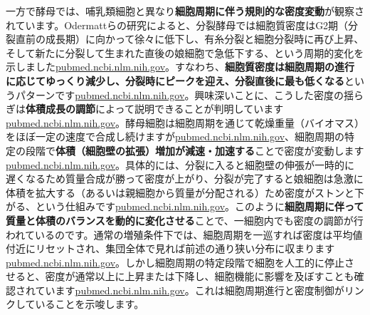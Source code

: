 一方で酵母では、哺乳類細胞と異なり\textbf{細胞周期に伴う規則的な密度変動}が観察されています。Odermattらの研究によると、分裂酵母では細胞質密度はG2期（分裂直前の成長期）に向かって徐々に低下し、有糸分裂と細胞分裂時に再び上昇、そして新たに分裂して生まれた直後の娘細胞で急低下する、という周期的変化を示しました\href{https://pubmed.ncbi.nlm.nih.gov/34100714/\#:~:text=Intracellular\%20density\%20impacts\%20the\%20physical,Spatially\%20heterogeneous\%20patterns\%20of\%20density}{pubmed.ncbi.nlm.nih.gov}。すなわち、\textbf{細胞質密度は細胞周期の進行に応じてゆっくり減少し、分裂時にピークを迎え、分裂直後に最も低くなる}というパターンです\href{https://pubmed.ncbi.nlm.nih.gov/34100714/\#:~:text=Intracellular\%20density\%20impacts\%20the\%20physical,cycle}{pubmed.ncbi.nlm.nih.gov}。興味深いことに、こうした密度の揺らぎは\textbf{体積成長の調節}によって説明できることが判明しています\href{https://pubmed.ncbi.nlm.nih.gov/34100714/\#:~:text=rapidly\%20at\%20cell\%20birth,cycle\%20arrests}{pubmed.ncbi.nlm.nih.gov}。酵母細胞は細胞周期を通じて乾燥重量（バイオマス）をほぼ一定の速度で合成し続けますが\href{https://pubmed.ncbi.nlm.nih.gov/34100714/\#:~:text=rapidly\%20at\%20cell\%20birth,to\%20modulation\%20of\%20volume\%20expansion}{pubmed.ncbi.nlm.nih.gov}、細胞周期の特定の段階で\textbf{体積（細胞壁の拡張）増加が減速・加速する}ことで密度が変動します\href{https://pubmed.ncbi.nlm.nih.gov/34100714/\#:~:text=rapidly\%20at\%20cell\%20birth,cycle\%20arrests}{pubmed.ncbi.nlm.nih.gov}。具体的には、分裂に入ると細胞壁の伸張が一時的に遅くなるため質量合成が勝って密度が上がり、分裂が完了すると娘細胞は急激に体積を拡大する（あるいは親細胞から質量が分配される）ため密度がストンと下がる、という仕組みです\href{https://pubmed.ncbi.nlm.nih.gov/34100714/\#:~:text=rapidly\%20at\%20cell\%20birth,cycle\%20arrests}{pubmed.ncbi.nlm.nih.gov}。このように\textbf{細胞周期に伴って質量と体積のバランスを動的に変化させる}ことで、一細胞内でも密度の調節が行われているのです。通常の増殖条件下では、細胞周期を一巡すれば密度は平均値付近にリセットされ、集団全体で見れば前述の通り狭い分布に収まります\href{https://pubmed.ncbi.nlm.nih.gov/34100714/\#:~:text=variation\%20,dependent\%20density}{pubmed.ncbi.nlm.nih.gov}。しかし細胞周期の特定段階で細胞を人工的に停止させると、密度が通常以上に上昇または下降し、細胞機能に影響を及ぼすことも確認されています\href{https://pubmed.ncbi.nlm.nih.gov/34100714/\#:~:text=division\%20and\%20rapid\%20expansion\%20post,to\%20modulation\%20of\%20volume\%20expansion}{pubmed.ncbi.nlm.nih.gov}。これは細胞周期進行と密度制御がリンクしていることを示唆します。

